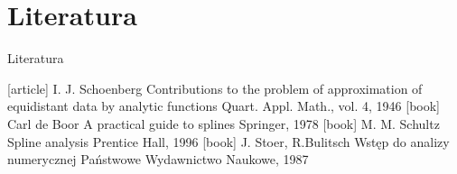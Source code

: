 \section{Literatura}
\begin{frame}{Literatura}
	\begin{thebibliography}{9}
   		[article]
             I. J. Schoenberg
            \newblock Contributions to the problem of approximation of equidistant data by analytic functions
            \newblock  Quart. Appl. Math., vol. 4, 1946
             Carl de Boor 
            \newblock A practical guide to splines
            \newblock Springer, 1978
             M. M. Schultz 
            \newblock Spline analysis 
            \newblock Prentice Hall, 1996
     	[book]
                  J. Stoer, R.Bulitsch 
                 \newblock Wstęp do analizy numerycznej 
                 \newblock Państwowe Wydawnictwo Naukowe, 1987
    \end{thebibliography}
\end{frame}